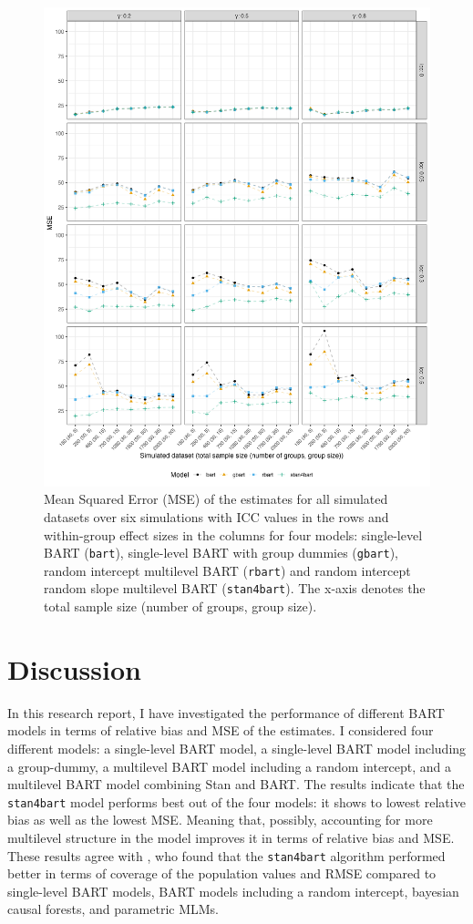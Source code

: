 \documentclass[10pt, a4paper, titlepage]{article}
\begin{document}
\begin{figure}[H]
\caption{Mean Squared Error (MSE) of the estimates for all simulated datasets over six simulations with ICC values in the rows and within-group effect sizes in the columns for four models: single-level BART (\texttt{bart}), single-level BART with group dummies (\texttt{gbart}), random intercept multilevel BART (\texttt{rbart}) and random intercept random slope multilevel BART (\texttt{stan4bart}). The x-axis denotes the total sample size (number of groups, group size).}
\centering
\label{fig:mseplots}
\includegraphics[width=1\textwidth]{mseplot.png}
\end{figure}

\newpage
\section{Discussion}

In this research report, I have investigated the performance of different BART models in terms of relative bias and MSE of the estimates. I considered four different models: a single-level BART model, a single-level BART model including a group-dummy, a multilevel BART model including a random intercept, and a multilevel BART model combining Stan and BART. The results indicate that the \texttt{stan4bart} model performs best out of the four models: it shows to lowest relative bias as well as the lowest MSE. Meaning that, possibly, accounting for more multilevel structure in the model improves it in terms of relative bias and MSE. These results agree with \citet{dorie2022}, who found that the \texttt{stan4bart} algorithm performed better in terms of coverage of the population values and RMSE compared to single-level BART models, BART models including a random intercept, bayesian causal forests, and parametric MLMs.
\end{document}
